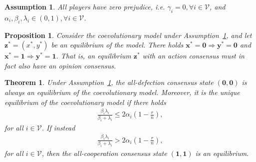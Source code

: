 \documentclass[10pt,a4paper]{amsart}
\newtheorem{assumption}{Assumption}
\newtheorem{proposition}{Proposition}
\newtheorem{theorem}{Theorem}
\renewcommand{\eqref}[1]{Eq.~(\ref{#1})}  %
\newcommand{\vect}[1]{\boldsymbol{#1}}
\begin{document}
\begin{assumption}\label{a:0}
    All players have zero prejudice, i.e. $\gamma_i = 0, \forall i \in \mathcal{V}$, and $\alpha_i, \beta_i, \lambda_i \in (0,1), \forall i \in \mathcal{V}$.
\end{assumption}

\begin{proposition}\label{prop:consensus}
    Consider the coevolutionary model under Assumption~\ref{a:0}, and let $\vect{z}^*=(x^*,y^*)$ be an equilibrium of the model. There holds $\vect x^* = \vect 0 \Rightarrow \vect y^* = \vect 0$ and $\vect x^* = \vect 1 \Rightarrow \vect y^* = \vect 1$. That is, an equilibrium $\vect z^*$ with an action consensus must in fact also have an opinion consensus.  
\end{proposition}

\begin{theorem}\label{theorem:equilibria}
    Under Assumption~\ref{a:0}, the all-defection consensus state $(\vect{0},\vect{0})$ is always an equilibrium of the coevolutionary model. Moreover, it is the unique equilibrium of the coevolutionary model if there holds
    \begin{align}\label{eq:all_D_unique}
        \frac{\beta_i\lambda_i}{\beta_i+\lambda_i} \leq 2\alpha_i\left(1-\frac{r}{n}\right),
    \end{align}
    for all $i\in\mathcal V$. If instead
       \begin{align}\label{eq:all_coop}
        \frac{\beta_i\lambda_i}{\beta_i+\lambda_i} > 2\alpha_i\left(1-\frac{r}{n}\right),
    \end{align}
    for all $i\in\mathcal V$, then the all-cooperation consensus state $(\vect{1},\vect{1})$ is an equilibrium.
\end{theorem}
\end{document}
